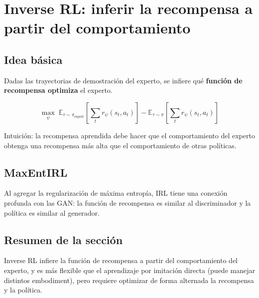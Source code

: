 \section{Inverse RL: inferir la recompensa a partir del comportamiento}

\subsection{Idea básica}

Dadas las trayectorias de demostración del experto, se infiere qué \textbf{función de recompensa optimiza} el experto.

$$\max_\psi \; \mathbb{E}_{\tau \sim \pi_{\text{expert}}}\left[\sum_t r_\psi(s_t, a_t)\right] - \mathbb{E}_{\tau \sim \pi}\left[\sum_t r_\psi(s_t, a_t)\right]$$

Intuición: la recompensa aprendida debe hacer que el comportamiento del experto obtenga una recompensa más alta que el comportamiento de otras políticas.

\subsection{MaxEntIRL}

Al agregar la regularización de máxima entropía, IRL tiene una conexión profunda con las GAN: la función de recompensa es similar al discriminador y la política es similar al generador.

\subsection{Resumen de la sección}

Inverse RL infiere la función de recompensa a partir del comportamiento del experto, y es más flexible que el aprendizaje por imitación directa (puede manejar distintos embodiment), pero requiere optimizar de forma alternada la recompensa y la política.

